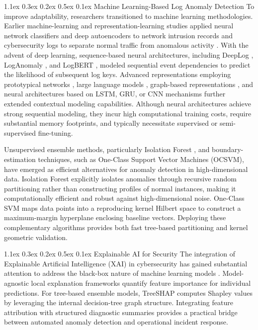\documentclass[10pt,conference]{IEEEtran}
\makeatletter
\renewcommand\subsection{\@startsection{subsection}{2}{\z@}%
  {1.1ex \@plus 0.3ex \@minus 0.2ex}%
  {0.5ex \@plus 0.1ex}%
  {\normalfont\fontsize{12pt}{14.4pt}\selectfont\bfseries}}
\makeatother
\begin{document}
\subsection{Machine Learning-Based Log Anomaly Detection}
To improve adaptability, researchers transitioned to machine learning methodologies. Earlier machine-learning and representation-learning studies applied neural network classifiers and deep autoencoders to network intrusion records and cybersecurity logs to separate normal traffic from anomalous activity \cite{b20, b21}. With the advent of deep learning, sequence-based neural architectures, including DeepLog \cite{b17}, LogAnomaly \cite{b18}, and LogBERT \cite{b19}, modeled sequential event dependencies to predict the likelihood of subsequent log keys. Advanced representations employing prototypical networks \cite{b4}, large language models \cite{b5}, graph-based representations \cite{b11}, and neural architectures based on LSTM, GRU, or CNN mechanisms \cite{b23, b24} further extended contextual modeling capabilities. Although neural architectures achieve strong sequential modeling, they incur high computational training costs, require substantial memory footprints, and typically necessitate supervised or semi-supervised fine-tuning.

Unsupervised ensemble methods, particularly Isolation Forest \cite{b14, b22}, and boundary-estimation techniques, such as One-Class Support Vector Machines (OCSVM), have emerged as efficient alternatives for anomaly detection in high-dimensional data. Isolation Forest explicitly isolates anomalies through recursive random partitioning rather than constructing profiles of normal instances, making it computationally efficient and robust against high-dimensional noise. One-Class SVM maps data points into a reproducing kernel Hilbert space to construct a maximum-margin hyperplane enclosing baseline vectors. Deploying these complementary algorithms provides both fast tree-based partitioning and kernel geometric validation.

\subsection{Explainable AI for Security}
The integration of Explainable Artificial Intelligence (XAI) in cybersecurity has gained substantial attention to address the black-box nature of machine learning models \cite{b6, b8, b12, b16}. Model-agnostic local explanation frameworks quantify feature importance for individual predictions. For tree-based ensemble models, TreeSHAP computes Shapley values by leveraging the internal decision-tree graph structure. Integrating feature attribution with structured diagnostic summaries provides a practical bridge between automated anomaly detection and operational incident response.
\end{document}
